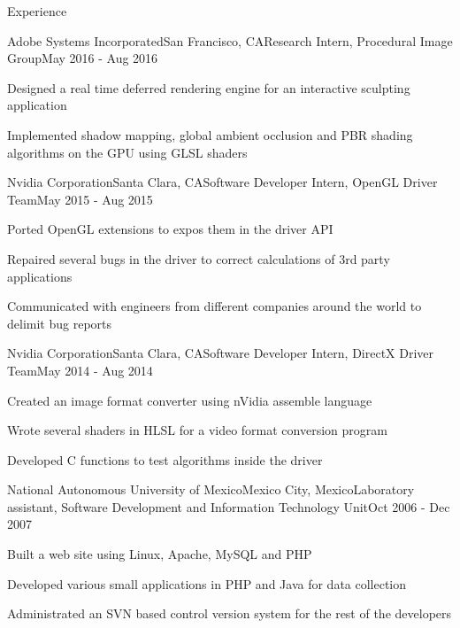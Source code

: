 \documentclass{resume} %
\begin{document}

\begin{rSection}{Experience}

\begin{rSubsection}{Adobe Systems Incorporated}{San Francisco, CA}{Research Intern, Procedural Image Group}{May 2016 - Aug 2016}
\item Designed a real time deferred rendering engine for an interactive sculpting application
\item Implemented shadow mapping, global ambient occlusion and PBR shading algorithms on the GPU using GLSL shaders
\end{rSubsection}

\begin{rSubsection}{Nvidia Corporation}{Santa Clara, CA}{Software Developer Intern, OpenGL Driver Team}{May 2015 - Aug 2015}
\item Ported OpenGL extensions to expos them in the driver API
\item Repaired several bugs in the driver to correct calculations of 3rd party applications
\item Communicated with engineers from different companies around the world to delimit bug reports
\end{rSubsection}

\begin{rSubsection}{Nvidia Corporation}{Santa Clara, CA}{Software Developer Intern, DirectX Driver Team}{May 2014 - Aug 2014}
\item Created an image format converter using nVidia assemble language
\item Wrote several shaders in HLSL for a video format conversion program
\item Developed C functions to test algorithms inside the driver
\end{rSubsection}

\begin{rSubsection}{National Autonomous University of Mexico}{Mexico City, Mexico}{Laboratory assistant, Software Development and Information Technology Unit}{Oct 2006 - Dec 2007}
\item Built a web site using Linux, Apache, MySQL and PHP
\item Developed various small applications in PHP and Java for data collection
\item Administrated an SVN based control version system for the rest of the developers
\end{rSubsection}


\end{rSection}
\end{document}

